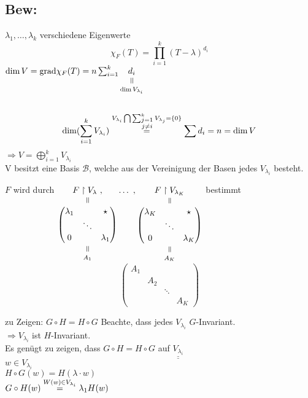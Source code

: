 \documentclass[titlepage,12pt,a4paper,ngerman]{report}
\newcommand{\verteq}{\rotatebox{90}{$\,=$}}
\newcommand{\equalto}[2]{\underset{\scriptstyle\overset{\mkern4mu\verteq}{#2}}{#1}}
\newcommand{\tx}[1]{\textrm{#1}}
\newcommand{\grad}{\tx{grad}}
\begin{document}
\subsection{Bew:}
$\lambda_1,\dots , \lambda_k$ verschiedene Eigenwerte
$$\chi_F(T) = \prod_{i=1}^{k}(T-\lambda)^{d_i}$$
$\dim V = \grad \chi_F(T) = n\sum_{i=1}^{k} \equalto{d_i}{\dim V_{\lambda_i}}$\\\\
$$\dim(\sum_{i=1}^{k} V_{\lambda_i}) \buildrel V_{\lambda_i} \bigcap \sum_{\substack{j=1 \\ j \neq i}}^{k} V_{\lambda_j} = \{0\}\over = \sum d_i = n = \dim V$$
$\Rightarrow V = \bigoplus^{k}_{i=1} V_{\lambda_i}$\\
V besitzt eine Basis $ \mathcal{B} $, welche aus der Vereinigung der Basen jedes $V_{\lambda_i}$ besteht.

$F$ wird durch $\equalto{F \upharpoonright V_\lambda\ ,}{\equalto{\begin{pmatrix}
		\lambda_1 & & \star \\ & \ddots & \\ 0 & & \lambda_1
		\end{pmatrix}}{A_1}} \dots \ ,\equalto{F \upharpoonright V_{\lambda_K}}{\equalto{\begin{pmatrix}
		\lambda_K & & \star \\ & \ddots & \\ 0 & & \lambda_K
		\end{pmatrix}}{A_K}}$ bestimmt \\

$$\begin{pmatrix}
A_1 &&&\\ &A_2&&\\ &&\ddots &\\ &&&A_K
\end{pmatrix}$$



zu Zeigen: $G\circ H = H\circ G$ Beachte, dass jedes $V_{\lambda_i}$ $G$-Invariant.\\
$\Rightarrow V_{\lambda_i}$ ist $H$-Invariant.\\
Es genügt zu zeigen, dass $G\circ H = H\circ G$ auf $\underline{\underline{V_{\lambda_i}}}$\\ 
$w \in V_{\lambda_i}$\\
$H\circ G(w) = H(\lambda\cdot w)$\\

$G\circ H (w) \buildrel{W(w) \in V_{\lambda_i}} \over{=} \lambda_1 H(w)$
\end{document}
